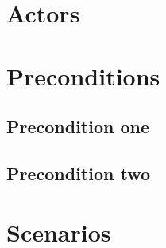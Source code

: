 \documentclass[notitlepage]{article}
\begin{document}
\section{Actors}
\begin{comment}
	\textcolor{blue}{\noindent List any roles or systems involved with this process or use case. A person or system fulfilling a role will be the actor in one of the steps.
	\begin{itemize}
		\item 
	\end{itemize}
}
\end{comment}

\section{Preconditions}

\begin{comment}
	\textcolor{blue}{A precondition of a use case represents the state of the system that must be present (i.e., must be true) prior to a use case being performed. A well-defined precondition can be easily checked.}
\end{comment}

\subsection{Precondition one}
\begin{comment}
   \textcolor{blue}{A first precondition.}
\end{comment}


\subsection{Precondition two}
\begin{comment}
   \textcolor{blue}{A second precondition.}
\end{comment}

\section{Scenarios}\label{sec:scenarios}

\begin{comment}
\begin{color}{blue}
A use case consists of a number of scenarios, each representing specific instances of the use case that correspond to specific inputs from the actor or to specific conditions in the environment. Each scenario describes alternative ways that the system provides a behavior, or it can describe failure or exception cases.
\end{color}
\end{comment}
\end{document}
